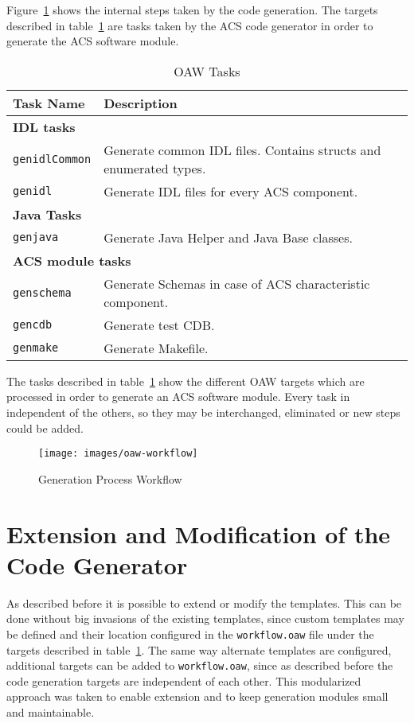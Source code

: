 Figure~\ref{fg:processWorkflow} shows the internal steps taken by the code generation.
The targets described in table~\ref{tb:oawtasks} are
tasks taken by the ACS code generator in order to generate
the ACS software module.
\begin{table}[htp]
\centering
\begin{tabular}{|l|l|}
\hline \textbf{Task Name} & \textbf{Description} \\
\hline \multicolumn{2}{|l|}{\textbf{IDL tasks}} \\
\hline \texttt{genidlCommon} & Generate common IDL files. Contains structs and enumerated types.\\
\hline \texttt{genidl} & Generate IDL files for every ACS component.\\
\hline \multicolumn{2}{|l|}{\textbf{Java Tasks}} \\
\hline \texttt{genjava} & Generate Java Helper and Java Base classes.\\
\hline \multicolumn{2}{|l|}{\textbf{ACS module tasks}} \\
\hline \texttt{genschema} & Generate Schemas in case of ACS characteristic component.\\
\hline \texttt{gencdb} & Generate test CDB.\\
\hline \texttt{genmake} & Generate Makefile.\\
\hline
\end{tabular}
\caption{OAW Tasks}
\label{tb:oawtasks}
\end{table}

The tasks described in table~\ref{tb:oawtasks}
show the different OAW targets
which are processed
in order to
generate an ACS software module.
Every task in independent of the
others, so
they may be interchanged, eliminated or
new steps could be added.
\begin{figure}[htp]
  \begin{center}
  \texttt{[image: images/oaw-workflow]}
  \end{center}
  \caption{Generation Process Workflow}
  \label{fg:processWorkflow}
\end{figure}


\section{Extension and Modification of the Code Generator}
\label{sec:extension-modification}
As described before it is possible to
extend or modify the templates.
This can be done without big
invasions of the existing templates,
since custom templates may be defined
and their location
configured
in the \lstinline[language=sh]!workflow.oaw! file
under the targets described in table~\ref{tb:oawtasks}.
The same way alternate templates
are configured,
additional targets can
be added
to \lstinline[language=sh]!workflow.oaw!,
since as described before the
code generation targets are independent of each other.
This modularized approach was taken to enable extension and
to keep generation modules small and maintainable.

